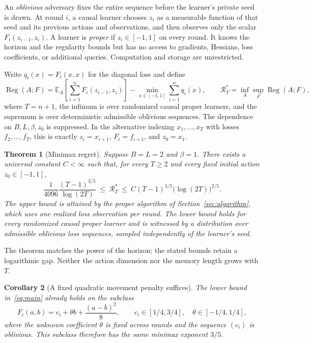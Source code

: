 \documentclass[11pt]{article}
\newtheorem{theorem}{Theorem}[section]
\newtheorem{corollary}[theorem]{Corollary}
\theoremstyle{definition}
\newcommand{\E}{\mathbb E}
\newcommand{\Reg}{\operatorname{Reg}}
\begin{document}
An \emph{oblivious} adversary fixes the entire sequence before the learner's private seed is drawn. At round $i$, a causal learner chooses $z_i$ as a measurable function of that seed and its previous actions and observations, and then observes only the scalar $F_i(z_{i-1},z_i)$. A learner is \emph{proper} if $z_i\in[-1,1]$ on every round. It knows the horizon and the regularity bounds but has no access to gradients, Hessians, loss coefficients, or additional queries. Computation and storage are unrestricted.

Write $q_i(x)=F_i(x,x)$ for the diagonal loss and define
\begin{equation}\label{eq:regret-definition}
 \Reg(A;F)
 =\E_A\!\left[\sum_{i=1}^nF_i(z_{i-1},z_i)\right]
   -\min_{x\in[-1,1]}\sum_{i=1}^n q_i(x),
 \qquad
 \mathcal R_T^*=\inf_A\sup_F\Reg(A;F),
\end{equation}
where $T=n+1$, the infimum is over randomized causal proper learners, and the supremum is over deterministic admissible oblivious sequences. The dependence on $B,L,\beta,z_0$ is suppressed. In the alternative indexing $x_1,\ldots,x_T$ with losses $f_2,\ldots,f_T$, this is exactly $z_i=x_{i+1}$, $F_i=f_{i+1}$, and $z_0=x_1$.

\begin{theorem}[Minimax regret]\label{thm:main}
Suppose $B=L=2$ and $\beta=1$. There exists a universal constant $C<\infty$ such that, for every $T\geq2$ and every fixed initial action $z_0\in[-1,1]$,
\begin{equation}\label{eq:main}
 \frac{1}{4096}\frac{(T-1)^{3/5}}{\log(2T)}
 \ \leq\ \mathcal R_T^*
 \ \leq\ C(T-1)^{3/5}\bigl(\log(2T)\bigr)^{2/5}.
\end{equation}
The upper bound is attained by the proper algorithm of Section~\ref{sec:algorithm}, which uses one realized loss observation per round. The lower bound holds for every randomized causal proper learner and is witnessed by a distribution over admissible oblivious loss sequences, sampled independently of the learner's seed.
\end{theorem}

The theorem matches the power of the horizon; the stated bounds retain a logarithmic gap. Neither the action dimension nor the memory length grows with $T$.

\begin{corollary}[A fixed quadratic movement penalty suffices]\label{cor:subclass}
The lower bound in~\eqref{eq:main} already holds on the subclass
\begin{equation}\label{eq:subclass}
 F_i(a,b)=c_i+\theta b+\frac{(a-b)^2}{8},
 \qquad c_i\in[1/4,3/4],\quad \theta\in[-1/4,1/4],
\end{equation}
where the unknown coefficient $\theta$ is fixed across rounds and the sequence $(c_i)$ is oblivious. This subclass therefore has the same minimax exponent $3/5$.
\end{corollary}
\end{document}
